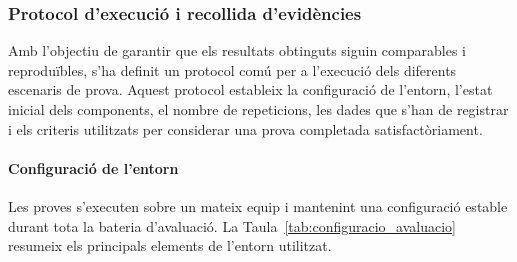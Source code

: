 \subsubsection{Protocol d'execució i recollida d'evidències}
\label{sec:protocol_avaluacio}

Amb l'objectiu de garantir que els resultats obtinguts siguin comparables i reproduïbles, s'ha definit un protocol comú per a l'execució dels diferents escenaris de prova. Aquest protocol estableix la configuració de l'entorn, l'estat inicial dels components, el nombre de repeticions, les dades que s'han de registrar i els criteris utilitzats per considerar una prova completada satisfactòriament.

\paragraph{Configuració de l'entorn}

Les proves s'executen sobre un mateix equip i mantenint una configuració estable durant tota la bateria d'avaluació. La Taula~\ref{tab:configuracio_avaluacio} resumeix els principals elements de l'entorn utilitzat.

